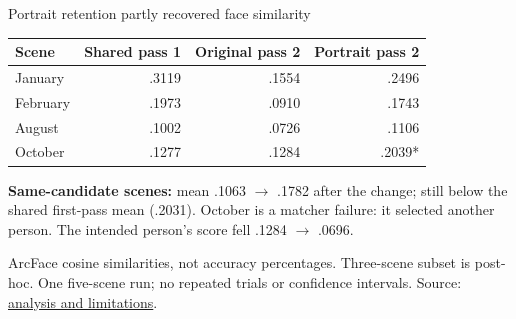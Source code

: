 \documentclass[aspectratio=169,11pt]{beamer}
\newcommand{\source}[1]{\par\vfill{\fontsize{7}{8}\selectfont\color{muted}#1\par}}
\newcommand{\repo}[2]{\href{https://github.com/aking526/ai-camera-roll/blob/84bd89bb9e947a0866aca6654ffc04a3a5d9119f/#1}{#2}}
\begin{document}
\begin{frame}{Portrait retention partly recovered face similarity}
\small
\begin{center}
\renewcommand{\arraystretch}{1.35}
\begin{tabular}{lrrr}
\toprule
\textbf{Scene} & \textbf{Shared pass 1} & \textbf{Original pass 2} & \textbf{Portrait pass 2}\\
\midrule
January & .3119 & .1554 & .2496\\
February & .1973 & .0910 & .1743\\
August & .1002 & .0726 & .1106\\
October & .1277 & .1284 & .2039*\\
\bottomrule
\end{tabular}
\end{center}
\vspace{3mm}
\textbf{Same-candidate scenes:} mean .1063 $\rightarrow$ .1782 after the change; still below the shared first-pass mean (.2031).
\vspace{3mm}
\alert{October is a matcher failure: it selected another person. The intended person's score fell .1284 $\rightarrow$ .0696.}
\source{ArcFace cosine similarities, not accuracy percentages. Three-scene subset is post-hoc. One five-scene run; no repeated trials or confidence intervals. Source: \repo{experiments/iteration_01_portrait_retention_2026-11-04/ANALYSIS.md}{analysis and limitations}.}
\end{frame}
\end{document}
